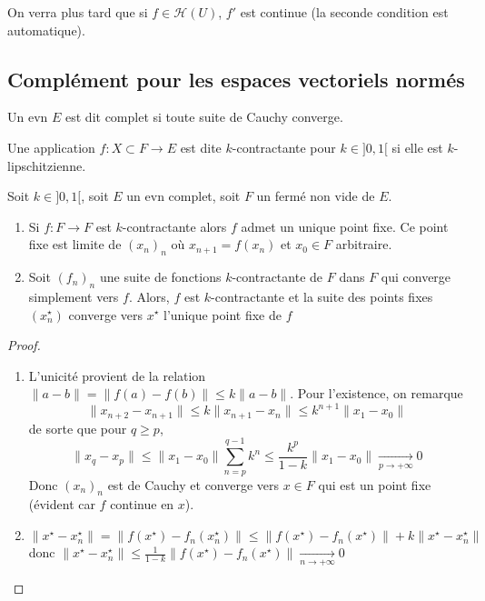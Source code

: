\begin{rem}
    On verra plus tard que si $f \in  \mathcal  H(U)$, $f'$ est continue (la seconde condition est automatique).
\end{rem}

\subsection{Complément pour les espaces vectoriels normés}

\begin{dfn}
    Un evn $E$ est dit complet si toute suite de Cauchy converge.
\end{dfn}

\begin{dfn}
    Une application $f:X\subset F \longrightarrow E$ est  dite  $k$-contractante pour  $k \in  ]0, 1[$ si elle est $k$-lipschitzienne.
\end{dfn}

\begin{thm}
    Soit $k \in  ]0,1[$, soit $E$ un evn complet, soit  $F$ un fermé non vide de  $E$.  \begin{enumerate}[label=(\alph*)]
        \item Si $f:F\longrightarrow F$ est $k$-contractante alors  $f$ admet un unique point fixe. Ce point fixe est limite de  $(x_n)_n$ où  $x_{n+1}=f(x_n)$ et $x_0 \in  F$ arbitraire.
        \item Soit $(f_n)_n$ une suite de fonctions  $k$-contractante de $F$ dans $F$ qui converge simplement vers  $f$. Alors, $f$ est  $k$-contractante et la suite des points fixes  $(x^\star_n)$ converge vers  $x^\star$ l'unique point fixe de  $f$
    \end{enumerate}
\end{thm}

\begin{proof}~
\begin{enumerate}[label=(\alph*)]
    \item L'unicité provient de la relation $\|a-b\|=\|f(a)-f(b)\|\leq k\|a-b\|$. Pour l'existence, on remarque \[
            \|x_{n+2}-x_{n+1}\|\leq k \|x_{n+1}-x_n\| \leq k^{n+1} \|x_1-x_0\|
    \] 
    de sorte que pour $q\geq p$, \[
        \|x_q-x_p\| \leq \|x_1-x_0\|\sum_{n=p}^{q-1} k^n\leq \frac{k^p}{1-k}\|x_1-x_0\|\xrightarrow[p\to +\infty]{}0
    \]
    Donc $(x_n)_n$ est de Cauchy et converge vers  $x \in  F$ qui est un point fixe (évident car $f$ continue en  $x$).
    \item \[
            \|x^\star-x_n^\star\|= \|f(x^\star)-f_n(x^\star_n)\|\leq \|f(x^\star)-f_n(x^\star)\| + k\|x^\star-x_n^\star\|
    \] 
    donc $\displaystyle \|x^\star - x_n^\star\|\leq \frac{1}{1-k} \|f(x^\star)-f_n(x^\star)\|\xrightarrow[n\to+\infty]{}0$
\end{enumerate}
\end{proof}


